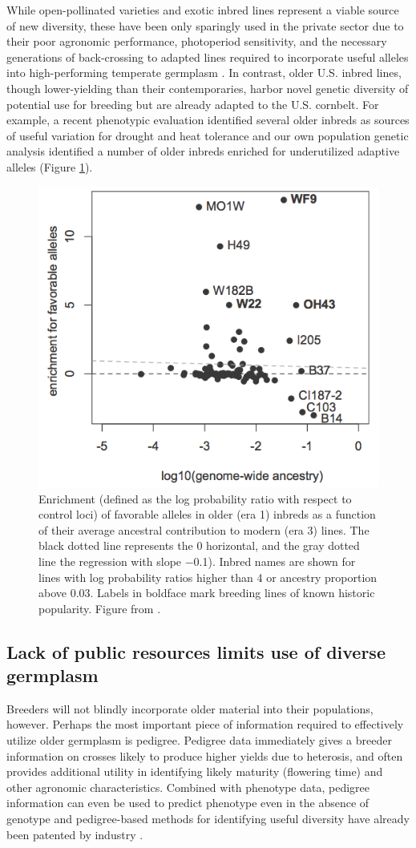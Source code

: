\documentclass[draft,12pt]{article}
\begin{document}
While open-pollinated varieties and exotic inbred lines represent a viable source of new diversity, these have been only sparingly used in the private sector due to their poor agronomic performance, photoperiod sensitivity, and the necessary generations of back-crossing to adapted lines required to incorporate useful alleles into high-performing temperate germplasm \citep{goodman1999broadening}.
In contrast, older U.S. inbred lines, though lower-yielding than their contemporaries, harbor novel genetic diversity of potential use for breeding but are already adapted to the U.S. cornbelt.  
For example, a recent phenotypic evaluation identified several older inbreds as sources of useful variation for drought and heat tolerance \citep{chen2012characterization} and our own population genetic analysis identified a number of older inbreds enriched for underutilized adaptive alleles (Figure \ref{fig:wf9}).

\begin{figure}
\includegraphics[width=0.5\linewidth]{joost_wf9.png}
\caption{Enrichment (defined as the log probability ratio with respect to control loci) of favorable alleles in older (era 1) inbreds as a function of their average ancestral contribution to modern (era 3) lines. The black dotted line represents the 0 horizontal, and the gray dotted line the regression  with slope −0.1). Inbred names are shown for lines with log probability ratios higher than 4 or ancestry proportion above 0.03. Labels in boldface mark breeding lines of known historic popularity. Figure from \citet{van2012historical}.} 
\label{fig:wf9}
\end{figure}

\subsection*{Lack of public resources limits use of diverse germplasm}

Breeders will not blindly incorporate older material into their populations, however.  
Perhaps the most important piece of information required to effectively utilize older germplasm is pedigree.
Pedigree data immediately gives a breeder information on crosses likely to produce higher yields due to heterosis, and often provides additional utility in identifying likely maturity (flowering time) and other agronomic characteristics. 
Combined with phenotype data, pedigree information can even be used to predict phenotype even in the absence of genotype \citep{piepho2008blup} and pedigree-based methods for identifying useful diversity have already been patented by industry \citep{sebastian1995method}.
\end{document}
